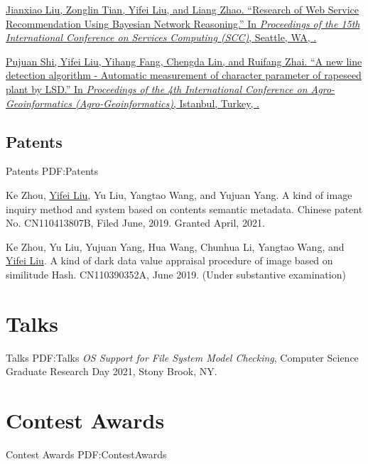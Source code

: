 \documentclass[letterpaper,10pt,oneside]{article}
\begin{document}
\begin{body}
\BigGap
\NumberedItem{[5]}
\href{https://link.springer.com/chapter/10.1007/978-3-319-94376-3_2}
{Jianxiao Liu, Zonglin Tian, \underline{Yifei Liu}, and Liang Zhao.
``Research of Web Service Recommendation Using Bayesian Network Reasoning.''
In \textit{Proceedings of the 15th International Conference on Services Computing (SCC)},
Seattle, WA,
.}

\BigGap
\NumberedItem{[6]}
\href{https://ieeexplore.ieee.org/abstract/document/7248122/}
{Pujuan Shi, \underline{Yifei Liu}, Yihang Fang, Chengda Lin, and Ruifang Zhai.
``A new line detection algorithm - Automatic measurement of character parameter of rapeseed plant by LSD.''
In \textit{Proceedings of the 4th International Conference on Agro-Geoinformatics (Agro-Geoinformatics)},
Istanbul, Turkey,
.}
\BigGap
\GapNoBreak

\subsection
{Patents}
{Patents}
{PDF:Patents}
\GapNoBreak

\NumberedItem{[1]}
Ke Zhou, \underline{Yifei Liu}, Yu Liu, Yangtao Wang, and Yujuan Yang. A kind of image inquiry method and system based on contents semantic metadata. Chinese patent No. CN110413807B, Filed June, 2019. Granted April, 2021.

\BigGap
\NumberedItem{[2]}
Ke Zhou, Yu Liu, Yujuan Yang, Hua Wang, Chunhua Li, Yangtao Wang, and \underline{Yifei Liu}. A kind of dark data value appraisal procedure of image based on similitude Hash. CN110390352A, June 2019. (Under substantive examination)

\section
{Talks}
{Talks}
{PDF:Talks}
\BulletItem
\emph{OS Support for File System Model Checking}, 
Computer Science Graduate Research Day 2021, Stony Brook, NY.
\GapNoBreak



\section
{Contest Awards}
{Contest Awards}
{PDF:ContestAwards}


\end{body}
\end{document}
